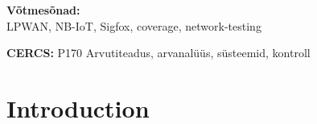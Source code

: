 \documentclass[12pt]{article}
\newcommand{\TODO}{\todo[inline]}
\begin{document}
{{\vspace*{1ex}

\noindent\textbf{Võtmesõnad:}\\
LPWAN, NB-IoT, Sigfox, coverage, network-testing 

\vspace*{1ex}

\noindent\textbf{CERCS:} P170 Arvutiteadus, arvanalüüs, süsteemid, kontroll

\vspace*{1ex}
}}%




\newpage
\tableofcontents
\hypersetup{hidelinks}
\newpage

\listoffigures
\listoftables


\newpage



\newpage
\section{Introduction}
\end{document}
